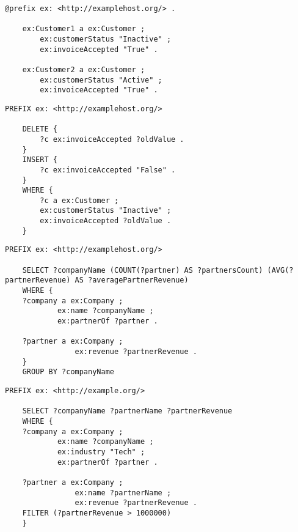 \begin{lstlisting}[caption={Create Customer Objects in SPARQL}, label={lst:createSPARQL}]
	@prefix ex: <http://examplehost.org/> .

	ex:Customer1 a ex:Customer ;
		ex:customerStatus "Inactive" ;
		ex:invoiceAccepted "True" .

	ex:Customer2 a ex:Customer ;
		ex:customerStatus "Active" ;
		ex:invoiceAccepted "True" .
\end{lstlisting}

\begin{lstlisting}[caption={Update Customer Objects in SPARQL}, label={lst:updateSPARQL}]
	PREFIX ex: <http://examplehost.org/>

	DELETE {
		?c ex:invoiceAccepted ?oldValue .
	}
	INSERT {
		?c ex:invoiceAccepted "False" .
	}
	WHERE {
		?c a ex:Customer ;
		ex:customerStatus "Inactive" ;
		ex:invoiceAccepted ?oldValue .
	}
\end{lstlisting}

\begin{lstlisting}[caption={Aggregation and Functions in SPARQL}, label={lst:aggFuncSPARQL}]
	PREFIX ex: <http://examplehost.org/>

	SELECT ?companyName (COUNT(?partner) AS ?partnersCount) (AVG(?partnerRevenue) AS ?averagePartnerRevenue)
	WHERE {
	?company a ex:Company ;
			ex:name ?companyName ;
			ex:partnerOf ?partner .
	
	?partner a ex:Company ;
				ex:revenue ?partnerRevenue .
	}
	GROUP BY ?companyName
\end{lstlisting}

\begin{lstlisting}[caption={Expressive Filtering in SPARQL}, label={lst:expressiveFilteringSPARQL}]
	PREFIX ex: <http://example.org/>

	SELECT ?companyName ?partnerName ?partnerRevenue
	WHERE {
	?company a ex:Company ;
			ex:name ?companyName ;
			ex:industry "Tech" ;
			ex:partnerOf ?partner .
	
	?partner a ex:Company ;
				ex:name ?partnerName ;
				ex:revenue ?partnerRevenue .
	FILTER (?partnerRevenue > 1000000)
	}
\end{lstlisting}

